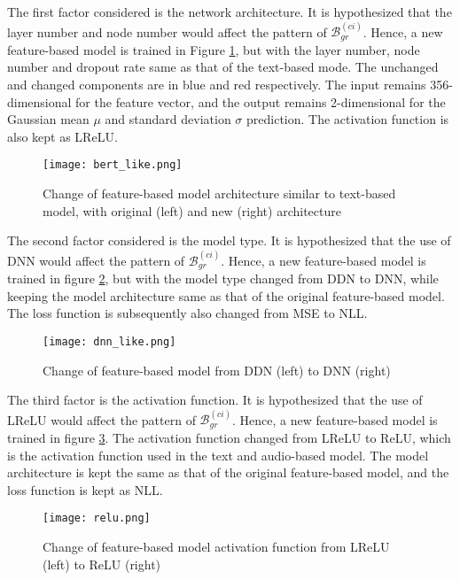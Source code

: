 The first factor considered is the network architecture. It is hypothesized that the layer number and node number would affect the pattern of $\mathcal{B}^{(ci)}_{gr}$. Hence, a new feature-based model is trained in Figure \ref{fig:bert_like}, but with the layer number, node number and dropout rate same as that of the text-based mode. The unchanged and changed components are in blue and red respectively. The input remains 356-dimensional for the feature vector, and the output remains 2-dimensional for the Gaussian mean $\mu$ and standard deviation $\sigma$ prediction. The activation function is also kept as LReLU.

\begin{figure}[H]
    \centering
    \texttt{[image: bert\_like.png]}
    \caption{Change of feature-based model architecture similar to text-based model, with original (left) and new (right) architecture}
    \label{fig:bert_like}
\end{figure}

The second factor considered is the model type. It is hypothesized that the use of DNN would affect the pattern of $\mathcal{B}^{(ci)}_{gr}$. Hence, a new feature-based model is trained in figure \ref{fig:dnn_like}, but with the model type changed from DDN to DNN, while keeping the model architecture same as that of the original feature-based model. The loss function is subsequently also changed from MSE to NLL.

\begin{figure}[H]
    \centering
    \texttt{[image: dnn\_like.png]}
    \caption{Change of feature-based model from DDN (left) to DNN (right)}
    \label{fig:dnn_like}
\end{figure}

The third factor is the activation function. It is hypothesized that the use of LReLU would affect the pattern of $\mathcal{B}^{(ci)}_{gr}$. Hence, a new feature-based model is trained in figure \ref{fig:relu}. The activation function changed from LReLU to ReLU, which is the activation function used in the text and audio-based model. The model architecture is kept the same as that of the original feature-based model, and the loss function is kept as NLL.

\begin{figure}[H]
    \centering
    \texttt{[image: relu.png]}
    \caption{Change of feature-based model activation function from LReLU (left) to ReLU (right)}
    \label{fig:relu}
\end{figure}

